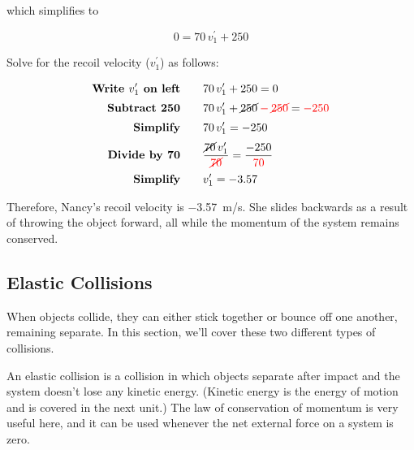 \documentclass[main.tex]{subfiles}
\begin{document}
 which simplifies to 

 \begin{equation*}
     0 = 70\,v_1^{\prime} + 250
 \end{equation*}

 Solve for the recoil velocity ($v_1^{\prime}$) as follows:

 \begin{align*}
     \textbf{Write $v_1^{\prime}$ on left} \qquad & 70\,v_1^{\prime} + 250 = 0\\[0.5ex]
     \textbf{Subtract 250} \qquad & 70\,v_1^{\prime} + \cancel{250} \mathbin{\color{red} - } \textcolor{red}{\cancel{250}} = \mathbin{\color{red} - } \textcolor{red}{250}\\[0.5ex]
     \textbf{Simplify} \qquad &  70\,v_1^{\prime} = -250\\[0.5ex]
     \textbf{Divide by 70} \qquad & \frac{\cancel{70}\,v_1^{\prime}}{\textcolor{red}{\cancel{70}}} = \frac{-250}{\textcolor{red}{70}}\\[0.5ex]
     \textbf{Simplify} \qquad & v_1^{\prime} = -3.57\\
 \end{align*}

Therefore, Nancy's recoil velocity is \SI{-3.57}{m/s}. She slides backwards as a result of throwing the object forward, all while the momentum of the system remains conserved.
 
\endsolution


\subsection{Elastic Collisions} \label{vecM50}

When objects collide, they can either stick together or bounce off one another, remaining separate. In this section, we’ll cover these two different types of collisions.
\vspace{1em}

An \gls{elastic collision} is a collision in which objects separate after impact and the system doesn't lose any kinetic energy. (Kinetic energy is the energy of motion and is covered in the next unit.) The law of conservation of momentum is very useful here, and it can be used whenever the net external force on a system is zero. 
\vspace{1em}
\end{document}
